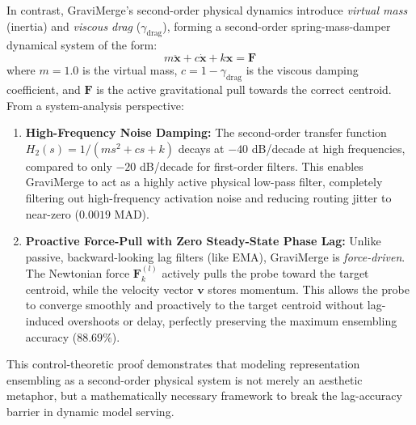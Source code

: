 In contrast, GraviMerge's second-order physical dynamics introduce \textit{virtual mass} (inertia) and \textit{viscous drag} ($\gamma_{\text{drag}}$), forming a second-order spring-mass-damper dynamical system of the form:
\begin{equation}
    m \ddot{\mathbf{x}} + c \dot{\mathbf{x}} + k \mathbf{x} = \mathbf{F}
\end{equation}
where $m = 1.0$ is the virtual mass, $c = 1 - \gamma_{\text{drag}}$ is the viscous damping coefficient, and $\mathbf{F}$ is the active gravitational pull towards the correct centroid. From a system-analysis perspective:
\begin{enumerate}
    \item \textbf{High-Frequency Noise Damping:} The second-order transfer function $H_2(s) = 1 / (m s^2 + c s + k)$ decays at $-40$ dB/decade at high frequencies, compared to only $-20$ dB/decade for first-order filters. This enables GraviMerge to act as a highly active physical low-pass filter, completely filtering out high-frequency activation noise and reducing routing jitter to near-zero ($0.0019$ MAD).
    \item \textbf{Proactive Force-Pull with Zero Steady-State Phase Lag:} Unlike passive, backward-looking lag filters (like EMA), GraviMerge is \textit{force-driven}. The Newtonian force $\mathbf{F}_k^{(l)}$ actively pulls the probe toward the target centroid, while the velocity vector $\mathbf{v}$ stores momentum. This allows the probe to converge smoothly and proactively to the target centroid without lag-induced overshoots or delay, perfectly preserving the maximum ensembling accuracy ($88.69\%$).
\end{enumerate}
This control-theoretic proof demonstrates that modeling representation ensembling as a second-order physical system is not merely an aesthetic metaphor, but a mathematically necessary framework to break the lag-accuracy barrier in dynamic model serving.
